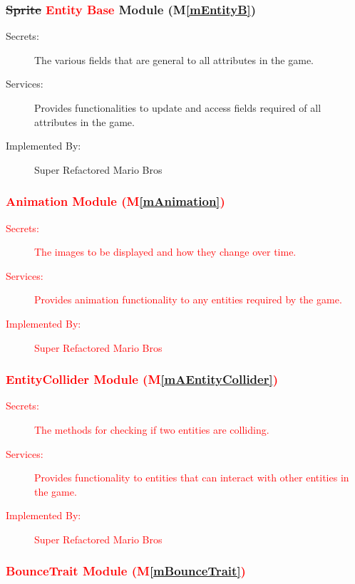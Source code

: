 \documentclass[12pt, titlepage]{article}
\newcommand{\mref}[1]{M\ref{#1}}
\begin{document}
\subsubsection{\sout{Sprite} \textcolor{red}{Entity Base} Module (\mref{mEntityB})}

\begin{description}
\item[Secrets:] The various fields that are general to all attributes in the game.
\item[Services:] Provides functionalities to update and access fields required of all attributes in the game.
\item[Implemented By:] Super Refactored Mario Bros
\end{description}

\subsubsection{\textcolor{red}{Animation Module (\mref{mAnimation})}}

\begin{description}
\item[\textcolor{red}{Secrets:}] \textcolor{red}{The images to be displayed and how they change over time.}
\item[\textcolor{red}{Services:}] \textcolor{red}{Provides animation functionality to any entities required by the game.}
\item[\textcolor{red}{Implemented By:}] \textcolor{red}{Super Refactored Mario Bros}
\end{description}

\subsubsection{\textcolor{red}{EntityCollider Module (\mref{mAEntityCollider})}}

\begin{description}
\item[\textcolor{red}{Secrets:}] \textcolor{red}{The methods for checking if two entities are colliding.}
\item[\textcolor{red}{Services:}] \textcolor{red}{Provides functionality to entities that can interact with other entities in the game.}
\item[\textcolor{red}{Implemented By:}] \textcolor{red}{Super Refactored Mario Bros}
\end{description}

\subsubsection{\textcolor{red}{BounceTrait Module (\mref{mBounceTrait})}}
\end{document}
